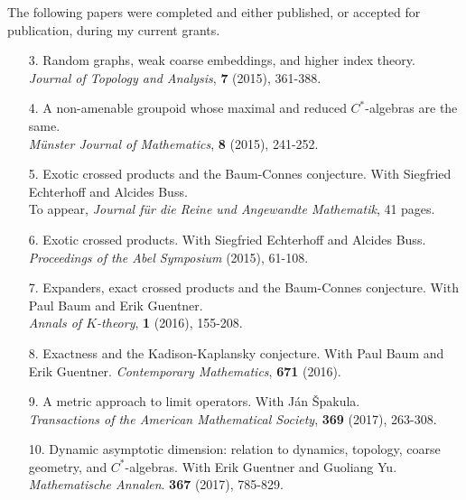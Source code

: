 \documentclass[11pt]{article}
\theoremstyle{plain}
\theoremstyle{definition}
\theoremstyle{remark}
\begin{document}
\noindent The following papers were completed and either published, or accepted for publication, during my current grants.  

\begin{enumerate}
\item[3.] Random graphs, weak coarse embeddings, and higher index theory.\\
{\small \emph{Journal of Topology and Analysis}, \textbf{7} (2015), 361-388.}


\item[4.]  A non-amenable groupoid whose maximal and reduced $C^*$-algebras are the same.\\
{\small \emph{M\"{u}nster Journal of Mathematics}, \textbf{8} (2015), 241-252.}




\item[5.] Exotic crossed products and the Baum-Connes conjecture.  With Siegfried Echterhoff and Alcides Buss.\\
{\small To appear, \emph{Journal f\"{u}r die Reine und Angewandte Mathematik}, 41 pages.}



\item[6.] Exotic crossed products.  With Siegfried Echterhoff and Alcides Buss.\\
{\small \emph{Proceedings of the Abel Symposium} (2015), 61-108.}


\item[7.] Expanders, exact crossed products and the Baum-Connes conjecture.  With Paul Baum and Erik Guentner.\\
{\small \emph{Annals of $K$-theory}, \textbf{1} (2016), 155-208.}



\item[8.] Exactness and the Kadison-Kaplansky conjecture. With Paul Baum and Erik Guentner.
{\small \emph{Contemporary Mathematics}, \textbf{671} (2016).}


\item[9.] A metric approach to limit operators.  With J\'{a}n \v{S}pakula. \\ 
{\small \emph{Transactions of the American Mathematical Society}, \textbf{369} (2017), 263-308.}



\item[10.] Dynamic asymptotic dimension: relation to dynamics, topology, coarse geometry, and ${C^*}$-algebras.  With Erik Guentner and Guoliang Yu.\\
{\small \emph{Mathematische Annalen}. \textbf{367} (2017), 785-829.}

\end{enumerate}
\end{document}
